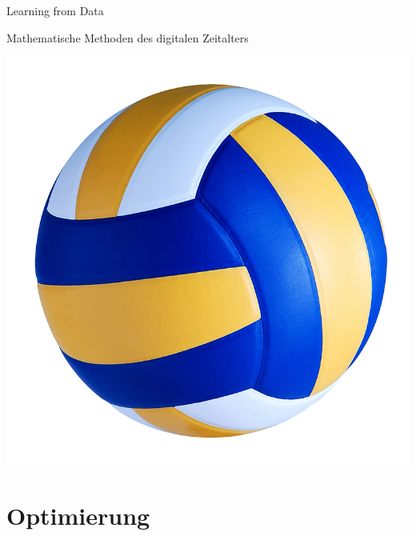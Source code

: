 \documentclass{newlayout}
\begin{document}
 \setcounter{page}{3}

\setcounter{tocdepth}{1}
 \tableofcontents

   \setcounter{secnumdepth}{1}


\setcounter{page}{7}
\setcounter{chapter}{0}




\begin{coursetitle}
  \centerline{Learning from Data} 
  \bigskip
  \Large \centerline{Mathematische Methoden des digitalen Zeitalters}
  \bigskip
 \includegraphics[width=.9\columnwidth]{Grafik-TempKursfoto.jpg}
 \label{fig:meinbild}
  \bigskip
\end{coursetitle}


\section{Optimierung}





%
%

%
\end{document}
